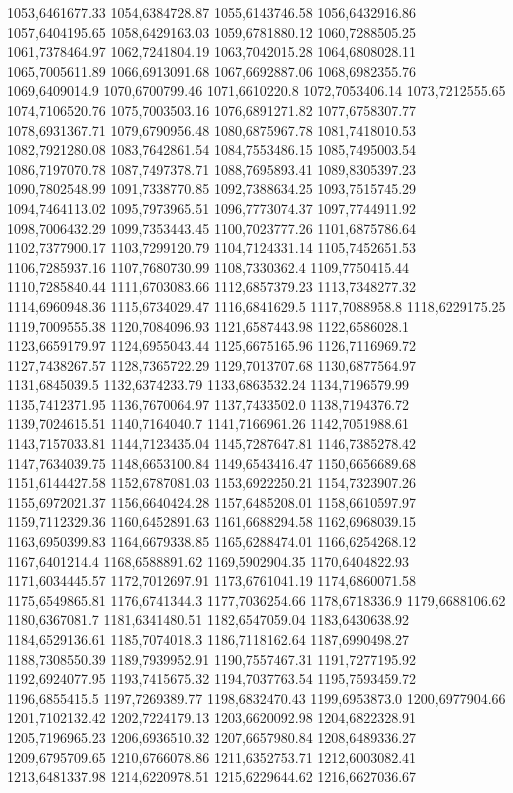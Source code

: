1053,6461677.33
1054,6384728.87
1055,6143746.58
1056,6432916.86
1057,6404195.65
1058,6429163.03
1059,6781880.12
1060,7288505.25
1061,7378464.97
1062,7241804.19
1063,7042015.28
1064,6808028.11
1065,7005611.89
1066,6913091.68
1067,6692887.06
1068,6982355.76
1069,6409014.9
1070,6700799.46
1071,6610220.8
1072,7053406.14
1073,7212555.65
1074,7106520.76
1075,7003503.16
1076,6891271.82
1077,6758307.77
1078,6931367.71
1079,6790956.48
1080,6875967.78
1081,7418010.53
1082,7921280.08
1083,7642861.54
1084,7553486.15
1085,7495003.54
1086,7197070.78
1087,7497378.71
1088,7695893.41
1089,8305397.23
1090,7802548.99
1091,7338770.85
1092,7388634.25
1093,7515745.29
1094,7464113.02
1095,7973965.51
1096,7773074.37
1097,7744911.92
1098,7006432.29
1099,7353443.45
1100,7023777.26
1101,6875786.64
1102,7377900.17
1103,7299120.79
1104,7124331.14
1105,7452651.53
1106,7285937.16
1107,7680730.99
1108,7330362.4
1109,7750415.44
1110,7285840.44
1111,6703083.66
1112,6857379.23
1113,7348277.32
1114,6960948.36
1115,6734029.47
1116,6841629.5
1117,7088958.8
1118,6229175.25
1119,7009555.38
1120,7084096.93
1121,6587443.98
1122,6586028.1
1123,6659179.97
1124,6955043.44
1125,6675165.96
1126,7116969.72
1127,7438267.57
1128,7365722.29
1129,7013707.68
1130,6877564.97
1131,6845039.5
1132,6374233.79
1133,6863532.24
1134,7196579.99
1135,7412371.95
1136,7670064.97
1137,7433502.0
1138,7194376.72
1139,7024615.51
1140,7164040.7
1141,7166961.26
1142,7051988.61
1143,7157033.81
1144,7123435.04
1145,7287647.81
1146,7385278.42
1147,7634039.75
1148,6653100.84
1149,6543416.47
1150,6656689.68
1151,6144427.58
1152,6787081.03
1153,6922250.21
1154,7323907.26
1155,6972021.37
1156,6640424.28
1157,6485208.01
1158,6610597.97
1159,7112329.36
1160,6452891.63
1161,6688294.58
1162,6968039.15
1163,6950399.83
1164,6679338.85
1165,6288474.01
1166,6254268.12
1167,6401214.4
1168,6588891.62
1169,5902904.35
1170,6404822.93
1171,6034445.57
1172,7012697.91
1173,6761041.19
1174,6860071.58
1175,6549865.81
1176,6741344.3
1177,7036254.66
1178,6718336.9
1179,6688106.62
1180,6367081.7
1181,6341480.51
1182,6547059.04
1183,6430638.92
1184,6529136.61
1185,7074018.3
1186,7118162.64
1187,6990498.27
1188,7308550.39
1189,7939952.91
1190,7557467.31
1191,7277195.92
1192,6924077.95
1193,7415675.32
1194,7037763.54
1195,7593459.72
1196,6855415.5
1197,7269389.77
1198,6832470.43
1199,6953873.0
1200,6977904.66
1201,7102132.42
1202,7224179.13
1203,6620092.98
1204,6822328.91
1205,7196965.23
1206,6936510.32
1207,6657980.84
1208,6489336.27
1209,6795709.65
1210,6766078.86
1211,6352753.71
1212,6003082.41
1213,6481337.98
1214,6220978.51
1215,6229644.62
1216,6627036.67
